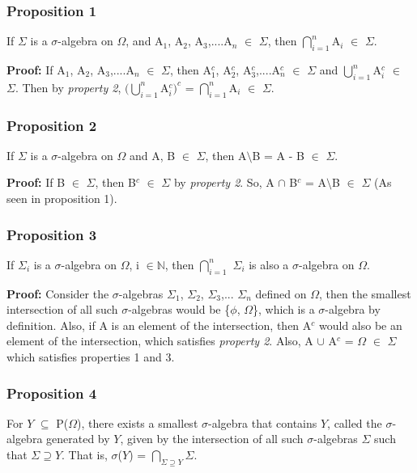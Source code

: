 \documentclass{article}
\begin{document}
\subsubsection{Proposition 1}
If $\Sigma$ is a $\sigma$-algebra on $\Omega$, and A$_1$, A$_2$, A$_3$,....A$_n$ $\in$ $\Sigma$, then $\bigcap\limits_{i=1}^n$A$_i$ $\in$ $\Sigma$.

\textbf{Proof: }If A$_1$, A$_2$, A$_3$,....A$_n$ $\in$ $\Sigma$, then A$_1^c$, A$_2^c$, A$_3^c$,....A$_n^c$ $\in$ $\Sigma$ and $\bigcup\limits_{i=1}^n$A$_i^c$ $\in$ $\Sigma$. Then by \textit{property 2}, $(\bigcup\limits_{i=1}^n$A$_i^c)^c$ = $\bigcap\limits_{i=1}^n$A$_i$ $\in$ $\Sigma$.


\subsubsection{Proposition 2}
If $\Sigma$ is a $\sigma$-algebra on $\Omega$ and A, B $\in$ $\Sigma$, then A$\setminus$B = A - B $\in$ $\Sigma$.

\textbf{Proof: }If B $\in$ $\Sigma$, then B$^c$ $\in$ $\Sigma$ by  \textit{property 2}. So, A $\cap$ B$^c$ = A$\setminus$B $\in$ $\Sigma$ (As seen in proposition 1).


\subsubsection{Proposition 3}
If $\Sigma_i$ is a $\sigma$-algebra on $\Omega$, i $\in \mathbb{N}$, then $\bigcap\limits_{i=1}^n$ $\Sigma_i$ is also a $\sigma$-algebra on $\Omega$.

\textbf{Proof: }Consider the $\sigma$-algebras $\Sigma_1$, $\Sigma_2$, $\Sigma_3$,... $\Sigma_n$ defined on $\Omega$, then the smallest intersection of all such $\sigma$-algebras would be \{$\phi$, $\Omega$\}, which is a $\sigma$-algebra by definition. Also, if A is an element of the intersection, then A$^c$ would also be an element of the intersection, which satisfies \textit{property 2}. Also, A $\cup$ A$^c$ = $\Omega$ $\in$ $\Sigma$ which satisfies properties 1 and 3.



\subsubsection{Proposition 4}
For $Y$ $\subseteq$ P($\Omega$), there exists a smallest $\sigma$-algebra that contains $Y$, called the $\sigma$-algebra generated by $Y$, given by the intersection of all such $\sigma$-algebras $\Sigma$ such that $\Sigma \supseteq Y$. That is, $\sigma$($Y$) = $\bigcap\limits_{\Sigma \supseteq Y}\Sigma$.
\end{document}
